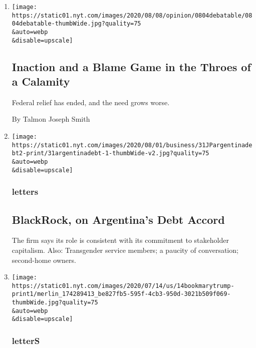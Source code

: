 \begin{enumerate}
\def\labelenumi{\arabic{enumi}.}
\item
  \href{/2020/08/04/opinion/coronavirus-federal-relief-inaction-debatable.html}{}

  \texttt{[image: https://static01.nyt.com/images/2020/08/08/opinion/0804debatable/0804debatable-thumbWide.jpg?quality=75\\\&auto=webp\\\&disable=upscale]}

  \hypertarget{inaction-and-a-blame-game-in-the-throes-of-a-calamity}{%
  \subsection{Inaction and a Blame Game in the Throes of a
  Calamity}\label{inaction-and-a-blame-game-in-the-throes-of-a-calamity}}

  Federal relief has ended, and the need grows worse.

  By Talmon Joseph Smith
\item
  \href{/2020/08/04/opinion/letters/blackrock-argentina.html}{}

  \texttt{[image: https://static01.nyt.com/images/2020/08/01/business/31JPargentinadebt2-print/31argentinadebt-1-thumbWide-v2.jpg?quality=75\\\&auto=webp\\\&disable=upscale]}

  \hypertarget{letters}{%
  \subsubsection{letters}\label{letters}}

  \hypertarget{blackrock-on-argentinas-debt-accord}{%
  \subsection{BlackRock, on Argentina's Debt
  Accord}\label{blackrock-on-argentinas-debt-accord}}

  The firm says its role is consistent with its commitment to
  stakeholder capitalism. Also: Transgender service members; a paucity
  of conversation; second-home owners.
\item
  \href{/2020/08/04/opinion/letters/trump-family.html}{}

  \texttt{[image: https://static01.nyt.com/images/2020/07/14/us/14bookmarytrump-print1/merlin\_174289413\_be827fb5-595f-4cb3-950d-3021b509f069-thumbWide.jpg?quality=75\\\&auto=webp\\\&disable=upscale]}

  \hypertarget{letters-1}{%
  \subsubsection{letterS}\label{letters-1}}


\end{enumerate}
